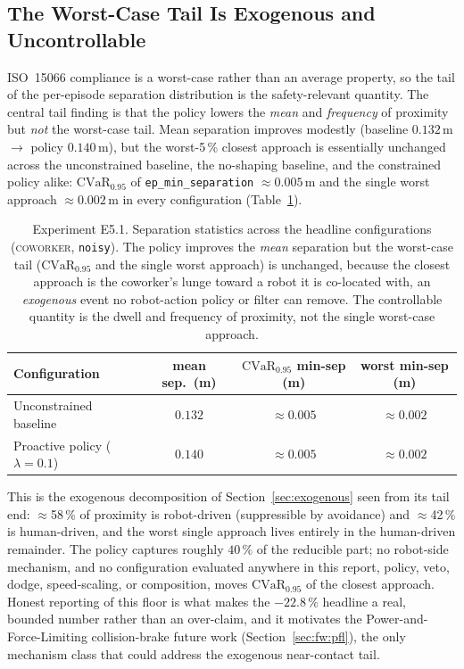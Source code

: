 \documentclass[11pt,a4paper]{report}
\newcommand{\iso}{ISO~15066}
\newcommand{\cvar}{\ensuremath{\mathrm{CVaR}}}
\newcommand{\coworker}{\textsc{coworker}}
\begin{document}
\subsection{The Worst-Case Tail Is Exogenous and Uncontrollable}
\label{sec:results:tail}

\iso{} compliance is a worst-case rather than an average property, so
the tail of the per-episode separation distribution is the
safety-relevant quantity. The central tail finding is that the policy
lowers the \emph{mean} and \emph{frequency} of proximity but
\emph{not} the worst-case tail. Mean separation improves modestly
(baseline $0.132$\,m $\rightarrow$ policy $0.140$\,m), but the
worst-5\,\% closest approach is essentially unchanged across the
unconstrained baseline, the no-shaping baseline, and the constrained
policy alike: $\cvar_{0.95}$ of \texttt{ep\_min\_separation}
$\approx 0.005$\,m and the single worst approach
$\approx 0.002$\,m in every configuration
(Table~\ref{tab:e5.1-tail}).

\begin{table}[htbp]
\centering
\caption{Experiment E5.1. Separation statistics across the headline
configurations (\coworker{}, \texttt{noisy}). The policy improves the
\emph{mean} separation but the worst-case tail ($\cvar_{0.95}$ and the
single worst approach) is unchanged, because the closest approach is
the coworker's lunge toward a robot it is co-located with, an
\emph{exogenous} event no robot-action policy or filter can remove.
The controllable quantity is the dwell and frequency of proximity, not
the single worst-case approach.}
\label{tab:e5.1-tail}
\small
\begin{tabular}{lccc}
\toprule
Configuration & mean sep.\ (m) & $\cvar_{0.95}$ min-sep (m) & worst min-sep (m) \\
\midrule
Unconstrained baseline             & $0.132$ & $\approx 0.005$ & $\approx 0.002$ \\
Proactive policy ($\lambda{=}0.1$) & $0.140$ & $\approx 0.005$ & $\approx 0.002$ \\
\bottomrule
\end{tabular}
\end{table}

This is the exogenous decomposition of
Section~\ref{sec:exogenous} seen from its tail end:
$\approx$58\,\% of proximity is robot-driven (suppressible by
avoidance) and $\approx$42\,\% is human-driven, and the worst single
approach lives entirely in the human-driven remainder. The policy
captures roughly $40\,\%$ of the reducible part; no robot-side
mechanism, and no configuration evaluated anywhere in this report,
policy, veto, dodge, speed-scaling, or composition, moves
$\cvar_{0.95}$ of the closest approach. Honest reporting of this
floor is what makes the $-22.8\,\%$ headline a real, bounded number
rather than an over-claim, and it motivates the
Power-and-Force-Limiting collision-brake future work
(Section~\ref{sec:fw:pfl}), the only mechanism class that could
address the exogenous near-contact tail.
\end{document}
